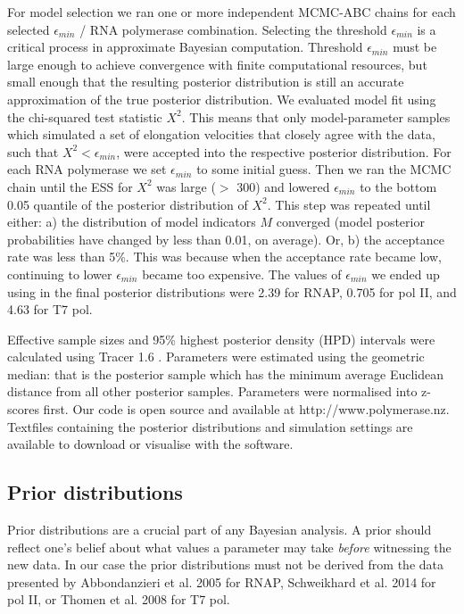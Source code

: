 \documentclass[10pt,letterpaper]{article}
\begin{document}
For model selection we ran one or more independent MCMC-ABC chains for each selected $\epsilon_{min}$ / RNA polymerase combination. 
Selecting the threshold $\epsilon_{min}$ is a critical process in approximate Bayesian computation. Threshold $\epsilon_{min}$ must be large enough to achieve convergence with finite computational resources, but small enough that the resulting posterior distribution is still an accurate approximation of the true posterior distribution. We evaluated model fit using the chi-squared test statistic $X^2$. This means that only model-parameter samples which simulated a set of elongation velocities that closely agree with the data, such that $X^2 < \epsilon_{min}$, were accepted into the respective posterior distribution. For each RNA polymerase we set $\epsilon_{min}$ to some initial guess. Then we ran the MCMC chain until the ESS for $X^2$ was large ($>$ 300) and lowered $\epsilon_{min}$ to the bottom 0.05 quantile of the posterior distribution of $X^2$. This step was repeated until either: a) the distribution of model indicators $M$ converged (model posterior probabilities have changed by less than 0.01, on average). Or, b) the acceptance rate was less than 5\%. This was because when the acceptance rate became low, continuing to lower $\epsilon_{min}$ became too expensive. The values of $\epsilon_{min}$ we ended up using in the final posterior distributions were 2.39 for RNAP, 0.705 for pol II, and 4.63 for T7 pol.




Effective sample sizes and 95\% highest posterior density (HPD) intervals were calculated using Tracer 1.6 \cite{rambaut2013tracer}. Parameters were estimated using the geometric median: that is the posterior sample which has the minimum average Euclidean distance from all other posterior samples. Parameters were normalised into z-scores first. Our code is open source and available at http://www.polymerase.nz. Textfiles containing the posterior distributions and simulation settings are available to download or visualise with the software.


\subsection*{Prior distributions}

Prior distributions are a crucial part of any Bayesian analysis. A prior should reflect one's belief about what values a parameter may take \textit{before} witnessing the new data. In our case the prior distributions must not be derived from the data presented by Abbondanzieri et al. 2005 \cite{abbondanzieri2005direct} for RNAP, Schweikhard et al. 2014 \cite{schweikhard2014transcription} for pol II, or Thomen et al. 2008 \cite{thomen2008t7} for T7 pol. \\
\end{document}
